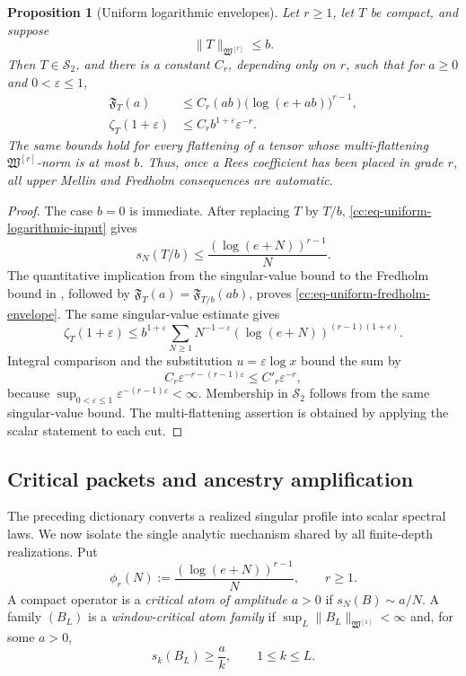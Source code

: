 \documentclass[10pt,reqno]{amsart}
\theoremstyle{plain}
\newtheorem{proposition}[theorem]{Proposition}
\theoremstyle{definition}
\theoremstyle{remark}
\begin{document}
\begin{proposition}[Uniform logarithmic envelopes]
\label{cc:prop-uniform-logarithmic-envelope}
Let \(r\ge1\), let \(T\) be compact, and suppose
\begin{equation}
 \|T\|_{\mathfrak W^{[r]}}\le b.
 \label{cc:eq-uniform-logarithmic-input}
\end{equation}
Then \(T\in\mathcal S_2\), and there is a constant \(C_r\), depending
only on \(r\), such that for \(a\ge0\) and \(0<\varepsilon\le1\),
\begin{align}
 \mathfrak F_T(a)
 &\le C_r(ab)\bigl(\log(e+ab)\bigr)^{r-1},
 \label{cc:eq-uniform-fredholm-envelope}\\
 \zeta_T(1+\varepsilon)
 &\le C_r b^{1+\varepsilon}\varepsilon^{-r}.
 \label{cc:eq-uniform-mellin-envelope}
\end{align}
The same bounds hold for every flattening of a tensor whose
multi-flattening \(\mathfrak W^{[r]}\)-norm is at most \(b\).  Thus, once a
Rees coefficient has been placed in grade \(r\), all upper Mellin and
Fredholm consequences are automatic.
\end{proposition}

\begin{proof}
The case \(b=0\) is immediate.  After replacing \(T\) by \(T/b\),
\eqref{cc:eq-uniform-logarithmic-input} gives
\[
 s_N(T/b)\le \frac{(\log(e+N))^{r-1}}{N}.
\]
The quantitative implication from the singular-value bound to the Fredholm
bound in , followed by
\(\mathfrak F_T(a)=\mathfrak F_{T/b}(ab)\), proves
\eqref{cc:eq-uniform-fredholm-envelope}.  The same singular-value estimate
gives
\[
 \zeta_T(1+\varepsilon)
 \le b^{1+\varepsilon}
 \sum_{N\ge1}N^{-1-\varepsilon}
       (\log(e+N))^{(r-1)(1+\varepsilon)}.
\]
Integral comparison and the substitution \(u=\varepsilon\log x\) bound the
sum by
\[
 C_r\varepsilon^{-r-(r-1)\varepsilon}
 \le C'_r\varepsilon^{-r},
\]
because \(\sup_{0<\varepsilon\le1}
\varepsilon^{-(r-1)\varepsilon}<\infty\).  Membership in
\(\mathcal S_2\) follows from the same singular-value bound.  The
multi-flattening assertion is obtained by applying the scalar statement to
each cut.
\end{proof}
\subsection{Critical packets and ancestry amplification}
\label{cc:subsec-critical-packets}

The preceding dictionary converts a realized singular profile into scalar
spectral laws.  We now isolate the single analytic mechanism shared by all
finite-depth realizations.  Put
\begin{equation}
 \phi_r(N):=\frac{(\log(e+N))^{r-1}}{N},\qquad r\ge1.
 \label{cc:eq-critical-profile}
\end{equation}
A compact operator is a \emph{critical atom of amplitude \(a>0\)} if
\(s_N(B)\sim a/N\).  A family \((B_L)\) is a
\emph{window-critical atom family} if
\(\sup_L\|B_L\|_{\mathfrak W^{[1]}}<\infty\) and, for some \(a>0\),
\[
 s_k(B_L)\ge \frac ak,\qquad 1\le k\le L.
\]
\end{document}
